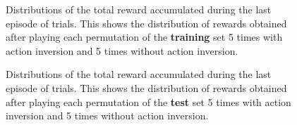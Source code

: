 \begin{figure}
	\centering
	\caption{Distributions of the total reward accumulated during the last
	episode of trials. This shows the distribution of rewards obtained after
	playing each permutation of the \textbf{training} set 5 times with action 
	inversion and 5 times without action inversion.}
	\label{fig:20permsLR_distrib}
\end{figure}

\begin{figure}
	\centering
	\caption{Distributions of the total reward accumulated during the last
	episode of trials. This shows the distribution of rewards obtained after
	playing each permutation of the \textbf{test} set 5 times with action 
	inversion and 5 times without action inversion.}
	\label{fig:20permsLR_unseen_distrib}
\end{figure}

